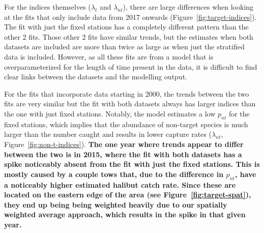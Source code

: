 \documentclass[12pt]{article}\usepackage[]{graphicx}\usepackage[]{color}
\begin{document}
For the indices themselves (\(\lambda_t\) and \(\lambda_{nt}\)), there are large differences when looking at the fits that only include data from 2017 onwards (Figure~\ref{fig:target-indices}). The fit with just the fixed stations has a completely different pattern than the other 2 fits. Those other 2 fits have similar trends, but the estimates when both datasets are included are more than twice as large as when just the stratified data is included. However, as all these fits are from a model that is overparameterized for the length of time present in the data, it is difficult to find clear links between the datasets and the modelling output.

For the fits that incorporate data starting in 2000, the trends between the two fits are very similar but the fit with both datasets always has larger indices than the one with just fixed stations. Notably, the model estimates a low \(p_{nt}\) for the fixed stations, which implies that the abundance of non-target species is much larger than the number caught and results in lower capture rates (\(\lambda_{nt}\), Figure~\ref{fig:non-t-indices}). \textbf{The one year where trends appear to differ between the two is in 2015, where the fit with both datasets has a spike noticeably absent from the fit with just the fixed stations. This is mostly caused by a couple tows that, due to the difference in \(p_{nt}\), have a noticeably higher estimated halibut catch rate. Since these are located on the eastern edge of the area (see Figure~\ref{fig:target-spat}), they end up being being weighted heavily due to our spatially weighted average approach, which results in the spike in that given year.}
\end{document}
